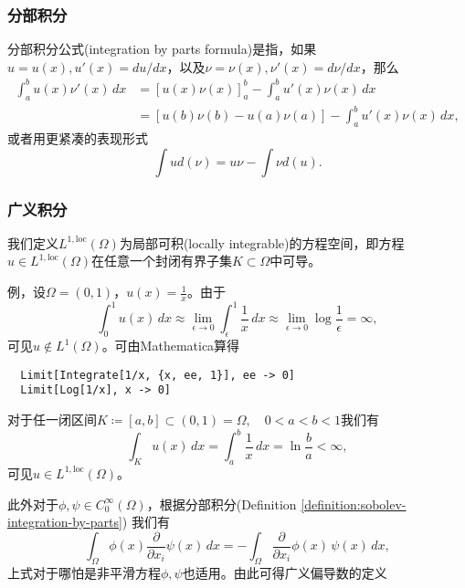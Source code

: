 \subsubsection{分部积分}
\begin{definition}[分部积分公式]
  \label{definition:sobolev-integration-by-parts}
  分部积分公式(integration by parts formula)是指，如果${u} = u(x), u'(x) = d u / d x$，以及$\nu = \nu(x), \nu'(x) = d \nu / d x$，那么
  \begin{equation*}
    \begin{split}
      \int_{a}^{b} u(x) \nu'(x) \, dx &= \left[ u(x) \nu(x) \right]_a^b - \int_a^b u'(x) \nu(x) \, dx \\
      &= \left[ u(b) \nu(b) - u(a) \nu(a) \right] - \int_a^b u'(x) \nu(x) \, dx,
  \end{split}
  \end{equation*}
  或者用更紧凑的表现形式
  \begin{equation*}
    \int u d(\nu) = u \nu - \int \nu d(u).
  \end{equation*}
\end{definition}

\subsubsection{广义积分}
我们定义$L^{1,\text{loc}}(\Omega)$为局部可积(locally integrable)的方程空间，即方程$u \in L^{1,\text{loc}}(\Omega)$在任意一个封闭有界子集$K \subset \Omega$中可导。

例，设$\Omega = (0,1)$，$u(x)=\frac{1}{x}$。由于
  \begin{equation*}
    \int_0^1 u(x) \, d x \approx \lim_{\epsilon \rightarrow 0} \int_{\epsilon}^1 \frac{1}{x} \, d x \approx \lim_{\epsilon \rightarrow 0} \log \frac{1}{\epsilon} = \infty,
  \end{equation*}
  可见$u \notin L^1(\Omega)$。可由Mathematica算得
  \begin{lstlisting}
  Limit[Integrate[1/x, {x, ee, 1}], ee -> 0]
  Limit[Log[1/x], x -> 0]
  \end{lstlisting}
对于任一闭区间$K \coloneqq [a,b] \subset (0,1) = \Omega, \quad 0 < a < b < 1$我们有
\begin{equation*}
  \int_{K} u(x)\, dx = \int_a^b \frac{1}{x} \, dx = \ln \frac{b}{a} < \infty,
\end{equation*}
可见$u \in L^{1, \text{loc}}(\Omega)$。

此外对于$\phi,\psi \in C_0^{\infty}(\Omega)$，根据分部积分(Definition \ref{definition:sobolev-integration-by-parts}) 我们有
\begin{equation*}
  \int_{\Omega} \phi(x) \frac{\partial}{\partial x_i} \psi(x) \, dx = - \int_{\Omega} \frac{\partial}{\partial x_i} \phi(x) \, \psi(x) \, d x,
\end{equation*}
上式对于哪怕是非平滑方程$\phi,\psi$也适用。由此可得广义偏导数的定义

